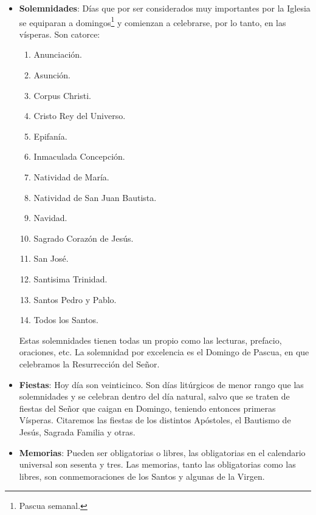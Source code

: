 \documentclass[letterpaper, 12pt]{book}
\begin{document}
    \begin{itemize}
        \item \textbf{Solemnidades}: D\'ias que por ser considerados muy importantes por la Iglesia se equiparan a domingos\footnote{Pascua semanal.} y comienzan a celebrarse, por lo tanto, en las v\'isperas. Son catorce:
        
        \begin{enumerate}
            \item Anunciaci\'on.
            \item Asunci\'on.
            \item Corpus Christi.
            \item Cristo Rey del Universo.
            \item Epifan\'ia.
            \item Inmaculada Concepci\'on.
            \item Natividad de Mar\'ia.
            \item Natividad de San Juan Bautista.
            \item Navidad.
            \item Sagrado Coraz\'on de Jes\'us.
            \item San Jos\'e.
            \item Santisima Trinidad.
            \item Santos Pedro y Pablo.
            \item Todos los Santos.
        \end{enumerate}
        
        Estas solemnidades tienen todas un propio como las lecturas, prefacio, oraciones, etc. La solemnidad por excelencia es el Domingo de Pascua, en que celebramos la Resurrección del Se\~nor.
        
        \item \textbf{Fiestas}: Hoy d\'ia son veinticinco. Son d\'ias lit\'urgicos de menor rango que las solemnidades y se celebran dentro del d\'ia natural, salvo que se traten de fiestas del Se\~nor que caigan en Domingo, teniendo entonces primeras V\'isperas. Citaremos las fiestas de los distintos Ap\'ostoles, el Bautismo de Jes\'us, Sagrada Familia y otras.
        
        \item \textbf{Memorias}: Pueden ser obligatorias o libres, las obligatorias en el calendario universal son sesenta y tres. Las memorias, tanto las obligatorias como las libres, son conmemoraciones de los Santos y algunas de la Virgen.
    \end{itemize}
    
\end{document}
